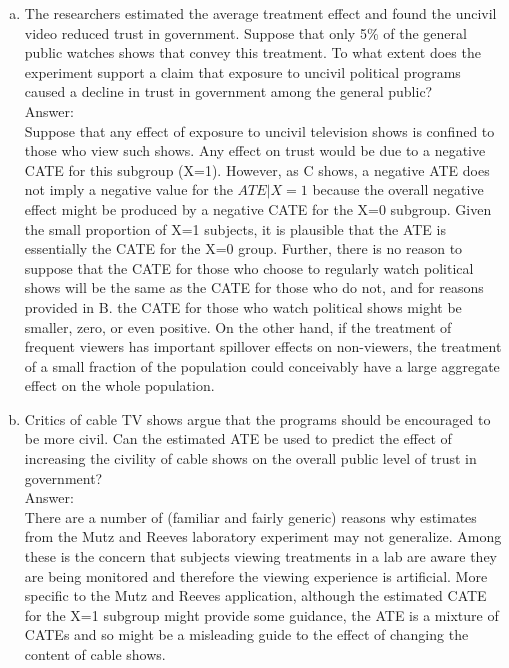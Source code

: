 \documentclass[11pt,notitlepage]{article}\usepackage[]{graphicx}\usepackage[]{color}
\begin{document}
\begin{enumerate}[a)]
\item The researchers estimated the average treatment effect and found the uncivil video reduced trust in government. Suppose that only 5\% of the general public watches shows that convey this treatment. To what extent does the experiment support a claim that exposure to uncivil political programs caused a decline in trust in government among the general public?\\
Answer:\\
Suppose that any effect of exposure to uncivil television shows is confined to those who view such shows. Any effect on trust would be due to a negative CATE for this subgroup (X=1). However, as C shows, a negative ATE does not imply a negative value for the $ATE|X=1$ because the overall negative effect might be produced by a negative CATE for the X=0 subgroup. Given the small proportion of X=1 subjects, it is plausible that the ATE is essentially the CATE for the X=0 group. Further, there is no reason to suppose that the CATE for those who choose to regularly watch political shows will be the same as the CATE for those who do not, and for reasons provided in B. the CATE for those who watch political shows might be smaller, zero, or even positive.  On the other hand, if the treatment of frequent viewers has important spillover effects on non-viewers, the treatment of a small fraction of the population could conceivably have a large aggregate effect on the whole population.
\item Critics of cable TV shows argue that the programs should be encouraged to be more civil. Can the estimated ATE be used to predict the effect of increasing the civility of cable shows on the overall public level of trust in government?\\
Answer:\\
There are a number of (familiar and fairly generic) reasons why estimates from the Mutz and Reeves laboratory experiment may not generalize. Among these is the concern that subjects viewing treatments in a lab are aware they are being monitored and therefore the viewing experience is artificial. More specific to the Mutz and Reeves application, although the estimated CATE for the X=1 subgroup might provide some guidance, the ATE is a mixture of CATEs and so might be a misleading guide to the effect of changing the content of cable shows. 


\end{enumerate}
\end{document}

